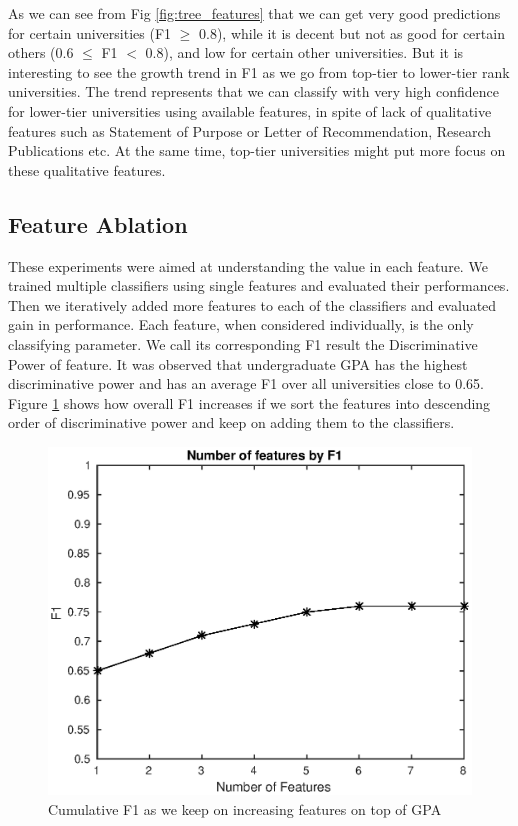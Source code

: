 \documentclass{sig-alternate-05-2015}
\begin{document}
As we can see from Fig \ref{fig:tree_features} that we can get very good predictions for certain universities (F1 $\geq$ 0.8), while it is decent but not as good for certain others (0.6 $\leq$ F1 $<$ 0.8), and low for certain other universities. But it is interesting to see the growth trend in F1 as we go from top-tier to lower-tier rank universities. The trend represents that we can classify with very high confidence for lower-tier universities using available features, in spite of lack of qualitative features such as Statement of Purpose or Letter of Recommendation, Research Publications etc. At the same time, top-tier universities might put more focus on these qualitative features.\\


\subsection{Feature Ablation}
\label{subsec:ablation-exp}
These experiments were aimed at understanding the value in each feature. We trained multiple classifiers using single features and evaluated their performances. Then we iteratively added more features to each of the classifiers and evaluated gain in performance. Each feature, when considered individually, is the only classifying parameter. We call its corresponding F1 result the Discriminative Power of feature. It was observed that undergraduate GPA has the highest discriminative power and has an average F1 over all universities close to 0.65. Figure \ref{fig:ablation} shows how overall F1 increases if we sort the features into descending order of discriminative power and keep on adding them to the classifiers.

\begin{figure}[h]
\centering
\includegraphics[scale=0.6]{ablation.eps}
\caption{Cumulative F1 as we keep on increasing features on top of GPA}
\label{fig:ablation}
\end{figure}
\end{document}

